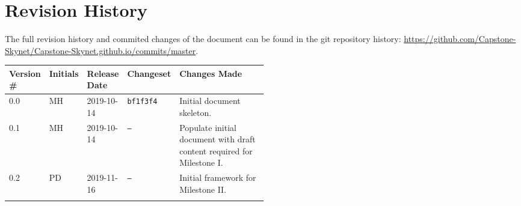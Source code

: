 \thispagestyle{empty}
\section*{Revision History}
The full revision history and commited changes of the document can be found in the git repository history: \href{https://github.com/Capstone-Skynet/Capstone-Skynet.github.io}{https://github.com/Capstone-Skynet/Capstone-Skynet.github.io/commits/master}.

\begin{table}[H]
\begin{tabular}{*{4}{l}p{0.5\linewidth}}
\hline
Version \# & Initials & Release Date & Changeset & Changes Made \\ \hline

0.0 & MH & 2019-10-14 & \texttt{bf1f3f4} & Initial document skeleton.\\
0.1 & MH & 2019-10-14 & \texttt{--} & Populate initial document with draft content required for Milestone I.\\
0.2 & PD & 2019-11-16 & \texttt{--} & Initial framework for Milestone II.\\

 & & & \\ \hline
\end{tabular}
\end{table}
